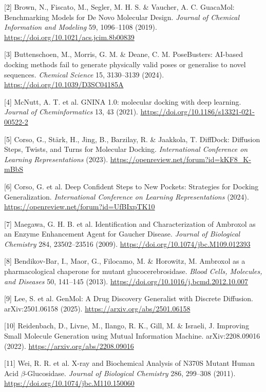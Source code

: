 \documentclass{article}
\begin{document}
[2] Brown, N., Fiscato, M., Segler, M. H. S. \& Vaucher, A. C. GuacaMol: Benchmarking Models for De Novo Molecular Design. \textit{Journal of Chemical Information and Modeling} 59, 1096--1108 (2019). \url{https://doi.org/10.1021/acs.jcim.8b00839}

[3] Buttenschoen, M., Morris, G. M. \& Deane, C. M. PoseBusters: AI-based docking methods fail to generate physically valid poses or generalise to novel sequences. \textit{Chemical Science} 15, 3130--3139 (2024). \url{https://doi.org/10.1039/D3SC04185A}

[4] McNutt, A. T. et al. GNINA 1.0: molecular docking with deep learning. \textit{Journal of Cheminformatics} 13, 43 (2021). \url{https://doi.org/10.1186/s13321-021-00522-2}

[5] Corso, G., St\"ark, H., Jing, B., Barzilay, R. \& Jaakkola, T. DiffDock: Diffusion Steps, Twists, and Turns for Molecular Docking. \textit{International Conference on Learning Representations} (2023). \url{https://openreview.net/forum?id=kKF8_K-mBbS}

[6] Corso, G. et al. Deep Confident Steps to New Pockets: Strategies for Docking Generalization. \textit{International Conference on Learning Representations} (2024). \url{https://openreview.net/forum?id=UfBIxpTK10}

[7] Maegawa, G. H. B. et al. Identification and Characterization of Ambroxol as an Enzyme Enhancement Agent for Gaucher Disease. \textit{Journal of Biological Chemistry} 284, 23502--23516 (2009). \url{https://doi.org/10.1074/jbc.M109.012393}

[8] Bendikov-Bar, I., Maor, G., Filocamo, M. \& Horowitz, M. Ambroxol as a pharmacological chaperone for mutant glucocerebrosidase. \textit{Blood Cells, Molecules, and Diseases} 50, 141--145 (2013). \url{https://doi.org/10.1016/j.bcmd.2012.10.007}

[9] Lee, S. et al. GenMol: A Drug Discovery Generalist with Discrete Diffusion. arXiv:2501.06158 (2025). \url{https://arxiv.org/abs/2501.06158}

[10] Reidenbach, D., Livne, M., Ilango, R. K., Gill, M. \& Israeli, J. Improving Small Molecule Generation using Mutual Information Machine. arXiv:2208.09016 (2022). \url{https://arxiv.org/abs/2208.09016}

[11] Wei, R. R. et al. X-ray and Biochemical Analysis of N370S Mutant Human Acid $\beta$-Glucosidase. \textit{Journal of Biological Chemistry} 286, 299--308 (2011). \url{https://doi.org/10.1074/jbc.M110.150060}
\end{document}
